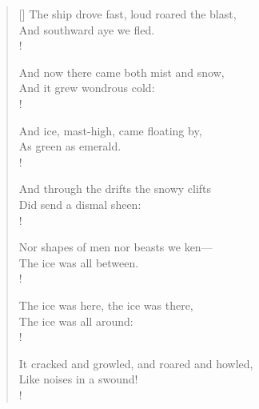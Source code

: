 \documentclass[12pt]{article}
\begin{document}
\begin{verse}[\linewidth]
The ship drove fast, loud roared the blast, \\
And southward aye we fled. \\!

\bigskip

And now there came both mist and snow, \\
And it grew wondrous cold: \\!

And ice, mast-high, came floating by, \\
As green as emerald. \\!

\bigskip

And through the drifts the snowy clifts \\
Did send a dismal sheen: \\!

Nor shapes of men nor beasts we ken— \\
The ice was all between. \\!

\bigskip

The ice was here, the ice was there, \\
The ice was all around: \\!

It cracked and growled, and roared and howled, \\
Like noises in a swound! \\!

\end{verse}
\end{document}
